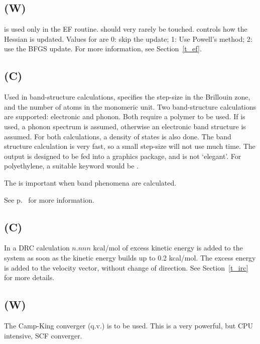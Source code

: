 \subsection*{ (W)}
 is used only in the EF routine.  
should  very  rarely  be touched.   controls how the Hessian is
updated. Values for  are  0:  skip the update; 1: Use Powell's method;
2: use the BFGS update.
For more information, see Section~\ref{t_ef}.



\subsection*{ (C)}
Used  in  band-structure  calculations,    specifies   the
step-size in the Brillouin zone, and the number of atoms in the monomeric
unit.  Two band-structure calculations  are  supported:   electronic  and
phonon.   Both  require a polymer to be used.  If is used, a
phonon spectrum is assumed, otherwise an electronic band structure  is
assumed. For  both  calculations,  a  density  of  states  is also done.  The
band structure calculation is very fast, so a small  step-size  will  not  use
much time. The output is designed to be fed into a graphics package, and is not
`elegant'.  For polyethylene, a suitable keyword would be .

The 
is important when band phenomena are calculated.

\begin{latexonly}
See p.~\pageref{polygeo} for more information.
\end{latexonly}


\subsection*{ (C)}
In a DRC calculation $n.nnn$ kcal/mol of excess  kinetic  energy  is
added  to  the  system  as  soon  as  the kinetic energy builds up to 0.2
kcal/mol.  The excess energy is added to the  velocity  vector,  without
change of direction. See Section~\ref{t_irc} for more details.



\subsection*{ (W)}
The Camp-King converger (q.v.) is to be used.  This is a  very powerful,
but CPU intensive, SCF converger.


